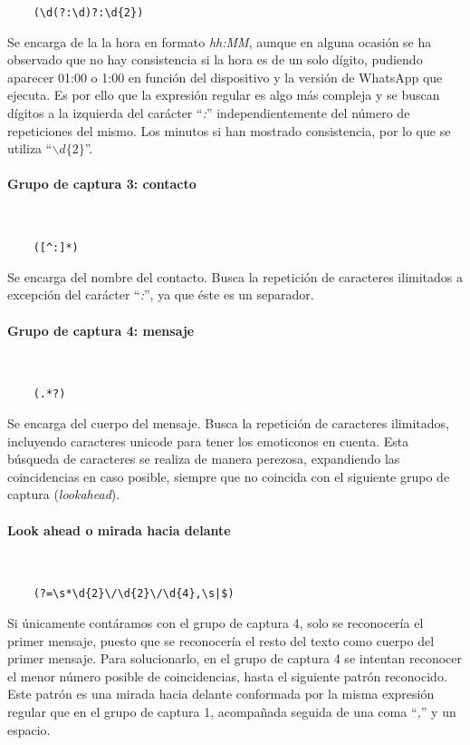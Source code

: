 \begin{lstlisting}
	(\d(?:\d)?:\d{2})
\end{lstlisting}

Se encarga de la la hora en formato \textit{hh:MM}, aunque en alguna ocasión se ha observado que no hay consistencia si la hora es de un solo dígito, pudiendo aparecer 01:00 o 1:00 en función del dispositivo y la versión de WhatsApp que ejecuta. Es por ello que la expresión regular es algo más compleja y se buscan dígitos a la izquierda del carácter ``\textit{:}'' independientemente del número de repeticiones del mismo. Los minutos si han mostrado consistencia, por lo que se utiliza ``$\backslash d\{2\}$''.

\paragraph{Grupo de captura 3: contacto}\mbox{}\\

\begin{lstlisting}
	([^:]*)
\end{lstlisting}

Se encarga del nombre del contacto. Busca la repetición de caracteres ilimitados a excepción del carácter ``\textit{:}'', ya que éste es un separador.

\paragraph{Grupo de captura 4: mensaje}\mbox{}\\

\begin{lstlisting}
	(.*?)
\end{lstlisting}

Se encarga del cuerpo del mensaje. Busca la repetición de caracteres ilimitados, incluyendo caracteres unicode para tener los emoticonos en cuenta. Esta búsqueda de caracteres se realiza de manera perezosa, expandiendo las coincidencias en caso posible, siempre que no coincida con el siguiente grupo de captura (\textit{lookahead}).

\paragraph{Look ahead o mirada hacia delante}\mbox{}\\

\begin{lstlisting}
	(?=\s*\d{2}\/\d{2}\/\d{4},\s|$)
\end{lstlisting}

Si únicamente contáramos con el grupo de captura 4, solo se reconocería el primer mensaje, puesto que se reconocería el resto del texto como cuerpo del primer mensaje. Para solucionarlo, en el grupo de captura 4 se intentan reconocer el menor número posible de coincidencias, hasta el siguiente patrón reconocido. Este patrón es una mirada hacia delante conformada por la misma expresión regular que en el grupo de captura 1, acompañada seguida de una coma ``\textit{,}'' y un espacio.